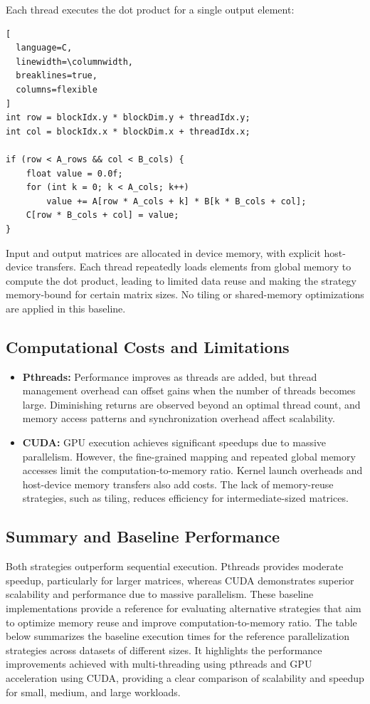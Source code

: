 \documentclass[conference, 12pt]{IEEEtran}
\begin{document}
Each thread executes the dot product for a single output element:
\begin{lstlisting}[
  language=C,
  linewidth=\columnwidth,
  breaklines=true,
  columns=flexible
]
int row = blockIdx.y * blockDim.y + threadIdx.y;
int col = blockIdx.x * blockDim.x + threadIdx.x;

if (row < A_rows && col < B_cols) {
    float value = 0.0f;
    for (int k = 0; k < A_cols; k++)
        value += A[row * A_cols + k] * B[k * B_cols + col];
    C[row * B_cols + col] = value;
}
\end{lstlisting}

Input and output matrices are allocated in device memory, with explicit host-device transfers. Each thread repeatedly loads elements from global memory to compute the dot product, leading to limited data reuse and making the strategy memory-bound for certain matrix sizes. No tiling or shared-memory optimizations are applied in this baseline.

\subsection{Computational Costs and Limitations}
\begin{itemize}
    \item \textbf{Pthreads:} Performance improves as threads are added, but thread management overhead can offset gains when the number of threads becomes large. Diminishing returns are observed beyond an optimal thread count, and memory access patterns and synchronization overhead affect scalability.
    \item \textbf{CUDA:} GPU execution achieves significant speedups due to massive parallelism. However, the fine-grained mapping and repeated global memory accesses limit the computation-to-memory ratio. Kernel launch overheads and host-device memory transfers also add costs. The lack of memory-reuse strategies, such as tiling, reduces efficiency for intermediate-sized matrices.
\end{itemize}

\subsection{Summary and Baseline Performance}
Both strategies outperform sequential execution. Pthreads provides moderate speedup, particularly for larger matrices, whereas CUDA demonstrates superior scalability and performance due to massive parallelism. These baseline implementations provide a reference for evaluating alternative strategies that aim to optimize memory reuse and improve computation-to-memory ratio.
The table below summarizes the baseline execution times for the reference parallelization strategies across datasets of different sizes. It highlights the performance improvements achieved with multi-threading using pthreads and GPU acceleration using CUDA, providing a clear comparison of scalability and speedup for small, medium, and large workloads.
\end{document}
